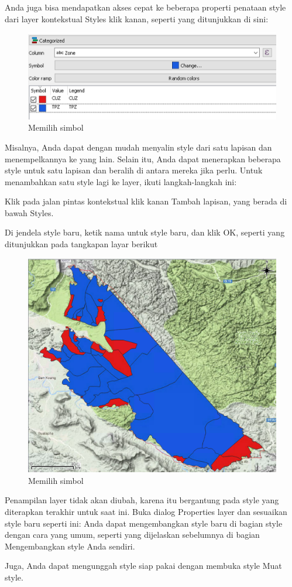 \documentclass[]{book}
\begin{document}
Anda juga bisa mendapatkan akses cepat ke beberapa properti penataan style dari layer kontekstual Styles klik kanan, seperti yang ditunjukkan di sini:

\begin{figure}

{\centering \includegraphics[width=0.3\linewidth]{images/09/fig95} 

}

\caption{Memilih simbol}\label{fig:fig951}
\end{figure}

Misalnya, Anda dapat dengan mudah menyalin style dari satu lapisan dan menempelkannya ke yang lain. Selain itu, Anda dapat menerapkan beberapa style untuk satu lapisan dan beralih di antara mereka jika perlu. Untuk menambahkan satu style lagi ke layer, ikuti langkah-langkah ini:

Klik pada jalan pintas kontekstual klik kanan Tambah lapisan, yang berada di bawah Styles.

Di jendela style baru, ketik nama untuk style baru, dan klik OK, seperti yang ditunjukkan pada tangkapan layar berikut

\begin{figure}

{\centering \includegraphics[width=0.3\linewidth]{images/09/fig96} 

}

\caption{Memilih simbol}\label{fig:fig961}
\end{figure}

Penampilan layer tidak akan diubah, karena itu bergantung pada style yang diterapkan terakhir untuk saat ini. Buka dialog Properties layer dan sesuaikan style baru seperti ini:
Anda dapat mengembangkan style baru di bagian style dengan cara yang umum, seperti yang dijelaskan sebelumnya di bagian Mengembangkan style Anda sendiri.

Juga, Anda dapat mengunggah style siap pakai dengan membuka style \textbar{} Muat style.
\end{document}
